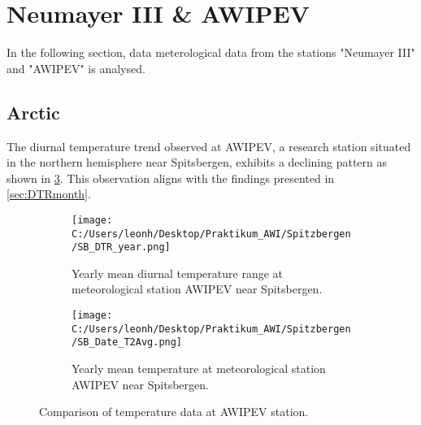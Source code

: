 \clearpage

\section{Neumayer III \& AWIPEV}
\label{Sec:LocalDTRTrend}

In the following section, data meterological data from the stations "Neumayer III" and "AWIPEV" is analysed.

\subsection*{Arctic}

The diurnal temperature trend observed at AWIPEV, a research station situated in the northern hemisphere near Spitsbergen, exhibits a declining pattern as shown in \cref{fig:AWIPEVcomparison}. This observation aligns with the findings presented in \cref*{sec:DTRmonth}.
\begin{figure}[ht]
    \centering

    \begin{subfigure}[t]{0.48\textwidth}
        \texttt{[image: C:/Users/leonh/Desktop/Praktikum\_AWI/Spitzbergen/SB\_DTR\_year.png]}
        \caption{Yearly mean diurnal temperature range at meteorological station AWIPEV near Spitsbergen.}
        \label{fig:DTRyearAWIPEV}
    \end{subfigure}
    \hfill
    \begin{subfigure}[t]{0.48\textwidth}
        \texttt{[image: C:/Users/leonh/Desktop/Praktikum\_AWI/Spitzbergen/SB\_Date\_T2Avg.png]}
        \caption{Yearly mean temperature at meteorological station AWIPEV near Spitsbergen.}
        \label{fig:TAvgyearAWIPEV}
    \end{subfigure}
    \caption{Comparison of temperature data at AWIPEV station.}
    \label{fig:AWIPEVcomparison}
\end{figure}

